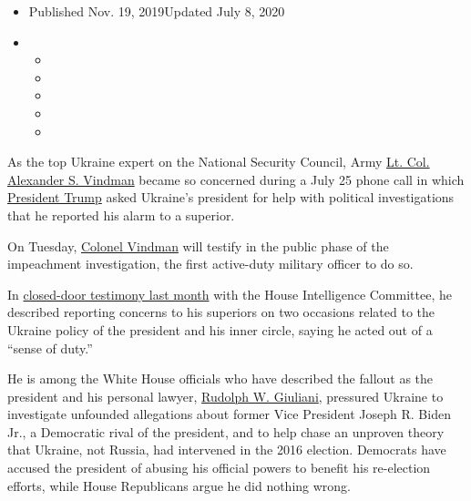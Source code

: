 \begin{itemize}
\item
  Published Nov. 19, 2019Updated July 8, 2020
\item
  \begin{itemize}
  \item
  \item
  \item
  \item
  \item
  \end{itemize}
\end{itemize}

As the top Ukraine expert on the National Security Council, Army
\href{https://www.nytimes.com/2020/07/08/us/politics/vindman-trump-ukraine-impeachment.html}{Lt.
Col. Alexander S. Vindman} became so concerned during a July 25 phone
call in which
\href{https://www.nytimes.com/2019/10/29/us/politics/who-is-alexander-vindman.html?module=inline}{President
Trump} asked Ukraine's president for help with political investigations
that he reported his alarm to a superior.

On Tuesday,
\href{https://www.nytimes.com/2020/02/07/us/politics/alexander-vindman-white-house.html}{Colonel
Vindman} will testify in the public phase of the impeachment
investigation, the first active-duty military officer to do so.

In
\href{https://www.nytimes.com/2019/10/28/us/politics/Alexander-Vindman-trump-impeachment.html?rref=collection\%2Fbyline\%2Fdanny-hakim\&action=click\&contentCollection=undefined\&region=stream\&module=stream_unit\&version=latest\&contentPlacement=8\&pgtype=collection}{closed-door
testimony last month} with the House Intelligence Committee, he
described reporting concerns to his superiors on two occasions related
to the Ukraine policy of the president and his inner circle, saying he
acted out of a ``sense of duty.''

He is among the White House officials who have described the fallout as
the president and his personal lawyer,
\href{https://www.nytimes.com/2019/10/11/us/politics/rudy-giuliani-investigation.html}{Rudolph
W. Giuliani}, pressured Ukraine to investigate unfounded allegations
about former Vice President Joseph R. Biden Jr., a Democratic rival of
the president, and to help chase an unproven theory that Ukraine, not
Russia, had intervened in the 2016 election. Democrats have accused the
president of abusing his official powers to benefit his re-election
efforts, while House Republicans argue he did nothing wrong.

